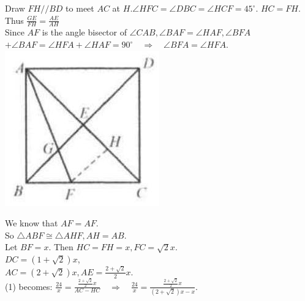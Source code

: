 \documentclass{article}
\begin{document}
Draw \(F H / / B D\) to meet \(A C\) at \(H . \angle H F C=\angle D B C=\angle H C F=45^{\circ}\). \(H C=F H\).\\
Thus \(\frac{G E}{F H}=\frac{A E}{A H}\)\\
Since \(A F\) is the angle bisector of \(\angle C A B, \angle B A F=\angle H A F, \angle B F A\) \(+\angle B A F=\angle H F A+\angle H A F=90^{\circ} \quad \Rightarrow \quad \angle B F A=\angle H F A\).\\
\centering
\includegraphics[width=\textwidth]{images/109.jpg}

We know that \(A F=A F\).\\
So \(\triangle A B F \cong \triangle A H F, A H=A B\).\\
Let \(B F=x\). Then \(H C=F H=x, F C=\sqrt{2} x\).\\
\(D C=(1+\sqrt{2}) x\),\\
\(A C=(2+\sqrt{2}) x, A E=\frac{2+\sqrt{2}}{2} x\).\\
(1) becomes: \(\frac{24}{x}=\frac{\frac{2+\sqrt{2}}{2} x}{A C-H C} \quad \Rightarrow \quad \frac{24}{x}=\frac{\frac{2+\sqrt{2}}{2} x}{(2+\sqrt{2}) x-x}\).
\end{document}
